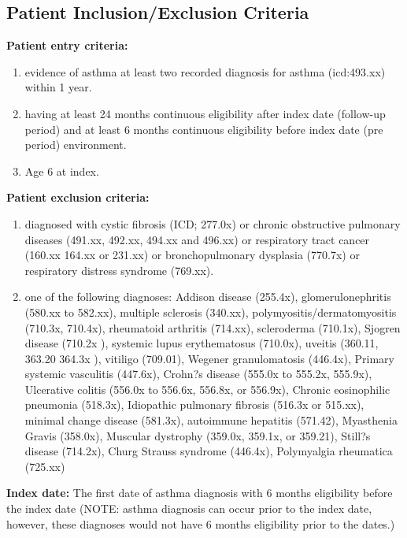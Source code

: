 \documentclass[10pt,a4paper,fleqn]{article}
\begin{document}
{\subsection{Patient Inclusion/Exclusion Criteria}
\label{pc}
\textbf{Patient entry criteria:}
\begin{enumerate}
  \item evidence of asthma at least two recorded diagnosis for asthma (icd:493.xx) within 1 year.
  \item having at least 24 months continuous eligibility after index date (follow-up period) and at least 6 months continuous eligibility before index date (pre\- period) environment.
  \item Age 6 at index.
\end{enumerate}
\textbf{Patient exclusion criteria:}
\begin{enumerate}
  \item diagnosed with cystic fibrosis  (ICD; 277.0x) or chronic obstructive pulmonary diseases (491.xx, 492.xx, 494.xx and 496.xx) or respiratory tract cancer (160.xx \- 164.xx or 231.xx) or bronchopulmonary dysplasia (770.7x) or respiratory distress syndrome (769.xx).
  \item one of the following diagnoses: Addison disease (255.4x), glomerulonephritis (580.xx to 582.xx), multiple sclerosis (340.xx), polymyositis/dermatomyositis (710.3x, 710.4x), rheumatoid arthritis (714.xx), scleroderma (710.1x), Sjogren disease (710.2x ), systemic lupus erythematosus (710.0x), uveitis (360.11, 363.20 364.3x ), vitiligo (709.01), Wegener granulomatosis (446.4x), Primary systemic vasculitis (447.6x), Crohn?s disease (555.0x to 555.2x, 555.9x), Ulcerative colitis (556.0x to 556.6x, 556.8x, or 556.9x), Chronic eosinophilic pneumonia (518.3x), Idiopathic pulmonary fibrosis (516.3x or 515.xx), minimal change disease (581.3x), autoimmune hepatitis (571.42), Myasthenia Gravis (358.0x), Muscular dystrophy (359.0x, 359.1x, or 359.21), Still?s disease (714.2x), Churg Strauss syndrome (446.4x), Polymyalgia rheumatica (725.xx)
\end{enumerate}
\textbf{Index date:} The first date of asthma diagnosis with 6 months eligibility before the index date (NOTE: asthma diagnosis can occur prior to the index date, however, these diagnoses would not have 6 months eligibility prior to the dates.) \\~\\

}
\end{document}
